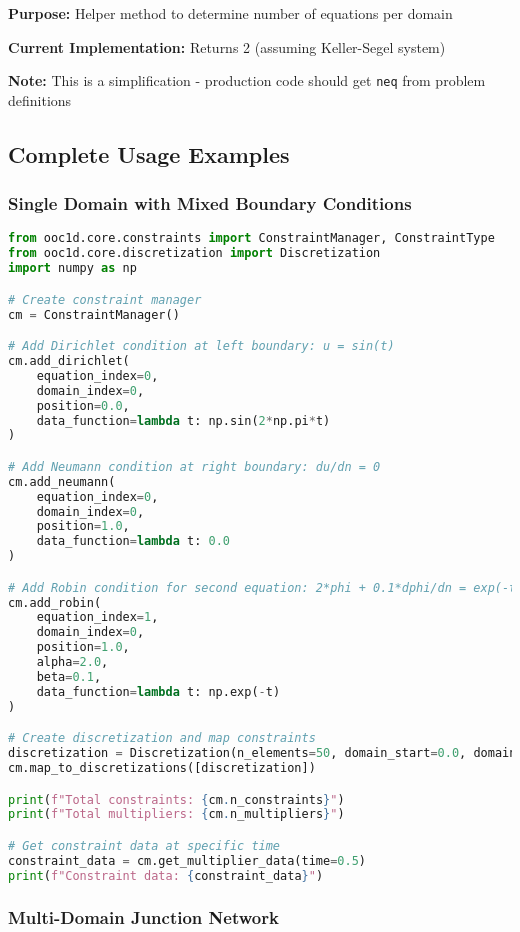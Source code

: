 \textbf{Purpose:} Helper method to determine number of equations per domain

\textbf{Current Implementation:} Returns 2 (assuming Keller-Segel system)

\textbf{Note:} This is a simplification - production code should get \texttt{neq} from problem definitions

\subsection{Complete Usage Examples}
\label{subsec:complete_usage_examples}

\subsubsection{Single Domain with Mixed Boundary Conditions}

\begin{lstlisting}[language=Python, caption=Single Domain Example]
from ooc1d.core.constraints import ConstraintManager, ConstraintType
from ooc1d.core.discretization import Discretization
import numpy as np

# Create constraint manager
cm = ConstraintManager()

# Add Dirichlet condition at left boundary: u = sin(t)
cm.add_dirichlet(
    equation_index=0,
    domain_index=0,
    position=0.0,
    data_function=lambda t: np.sin(2*np.pi*t)
)

# Add Neumann condition at right boundary: du/dn = 0
cm.add_neumann(
    equation_index=0,
    domain_index=0,
    position=1.0,
    data_function=lambda t: 0.0
)

# Add Robin condition for second equation: 2*phi + 0.1*dphi/dn = exp(-t)
cm.add_robin(
    equation_index=1,
    domain_index=0,
    position=1.0,
    alpha=2.0,
    beta=0.1,
    data_function=lambda t: np.exp(-t)
)

# Create discretization and map constraints
discretization = Discretization(n_elements=50, domain_start=0.0, domain_length=1.0)
cm.map_to_discretizations([discretization])

print(f"Total constraints: {cm.n_constraints}")
print(f"Total multipliers: {cm.n_multipliers}")

# Get constraint data at specific time
constraint_data = cm.get_multiplier_data(time=0.5)
print(f"Constraint data: {constraint_data}")
\end{lstlisting}

\subsubsection{Multi-Domain Junction Network}

